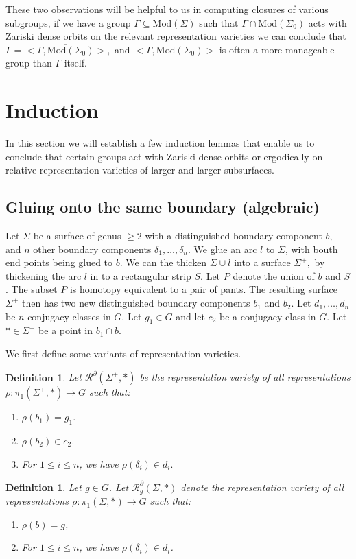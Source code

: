 \documentclass{article}
\newcommand{\Rc}{\mathcal{R}}
\newcommand{\Mod}{\textrm{Mod}}
\newtheorem{definition}[theorem]{Definition}
\begin{document}
These two observations will be helpful to us in computing closures of various subgroups, if we have a group $\Gamma \subseteq \Mod(\Sigma)$ such that $\Gamma \cap \Mod(\Sigma_0)$ acts with Zariski dense orbits on the relevant representation varieties we can conclude that $\overline\Gamma = \overline{<\Gamma, \Mod(\Sigma_0)>},$ and $<\Gamma, \Mod(\Sigma_0)>$ is often a more manageable group than $\Gamma$ itself. 

\section{Induction}
In this section we will establish a few induction lemmas that enable us to conclude that certain groups act with Zariski dense orbits or ergodically on relative representation varieties of larger and larger subsurfaces.

\subsection{Gluing onto the same boundary (algebraic)}
      Let $\Sigma $ be a surface of genus $\ge 2$ with a distinguished boundary component $b,$ and $n$ other boundary components $\delta_1, \dots, \delta_n $. We glue an arc $l$ to $\Sigma$, with bouth end points being glued to $b.$ We can the thicken $\Sigma \cup l$ into a surface $\Sigma^+,$ by thickening the arc $l$ in to a rectangular strip $S$.     Let $P$ denote the union of $b$ and  $S$. The subset  $P$ is homotopy equivalent to a pair of pants. The resulting surface $\Sigma^+$ then has two new distinguished boundary components $b_1$ and $b_2$. Let $d_1 ,\dots, d_n$ be $n$ conjugacy classes in $G$. Let $g_1 \in G$ and let $ c_2$ be a conjugacy class in $G$. Let $* \in \Sigma^+$ be a point in $b_1 \cap b$.
    
    We first define some variants of representation varieties.
    \begin{definition}
      
        Let $\Rc^{\partial} (\Sigma^+,*)$ be the representation variety of all representations $\rho: \pi_1(\Sigma^+, *) \to G$ such that:
        \begin{enumerate}
        \item $\rho(b_1) =g_1.$
        \item  $\rho(b_2) \in c_2$. 
        \item For $1\le i \le n$, we have $\rho(\delta_i) \in d_i.$
        \end{enumerate}
    \end{definition}
    \begin{definition}
            Let $g \in G$. Let $\Rc_g^{\partial} (\Sigma, *)$ denote the representation variety of all representations $\rho: \pi_1 (\Sigma,*) \to G$ such that: 
    \begin{enumerate}
        \item $\rho(b) =g$,
        \item For $1\le i \le n$, we have $\rho(\delta_i) \in d_i$.
    \end{enumerate}
    \end{definition}
\end{document}
